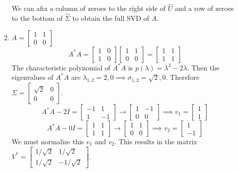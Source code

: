 \documentclass[12pt]{article}
\numberwithin{equation}{section}
\begin{document}
\begin{enumerate}
\begin{enumerate}
    We can afix a column of zeroes to the right side of $\hat{U}$ and a row of zeroes to the bottom of $\hat{\Sigma}$ to obtain the full SVD of $A$.
    \item $A=\left[\begin{array}{cc}1&1\\0&0\end{array}\right]$
    $$A^*A=\left[\begin{array}{cc}1&0\\1&0\end{array}\right]\left[\begin{array}{cc}1&1\\0&0\end{array}\right]=\left[\begin{array}{cc}1&1\\1&1\end{array}\right]$$
    The characteristic polynomial of $A^*A$ is $p(\lambda)=\lambda^2-2\lambda$. Then the eigenvalues of $A^*A$ are $\lambda_{1,2}=2,0\implies \sigma_{1,2}=\sqrt{2},0$. Therefore $\Sigma=\left[\begin{array}{cc}\sqrt{2}&0\\0&0\end{array}\right]$.
    $$A^*A-2I=\left[\begin{array}{cc}-1&1\\1&-1\end{array}\right]\to\left[\begin{array}{cc}1&-1\\0&0\end{array}\right]\implies v_1=\left[\begin{array}{c}1\\1\end{array}\right]$$
    $$A^*A-0I=\left[\begin{array}{cc}1&1\\1&1\end{array}\right]\to\left[\begin{array}{cc}1&1\\0&0\end{array}\right]\implies v_2=\left[\begin{array}{c}1\\-1\end{array}\right]$$
    We must normalize this $v_1$ and $v_2$. This results in the matrix $V^*=\left[\begin{array}{cc}1/\sqrt{2}&1/\sqrt{2}\\1/\sqrt{2}&-1/\sqrt{2}\end{array}\right]$.

\end{enumerate}
\end{enumerate}
\end{document}
